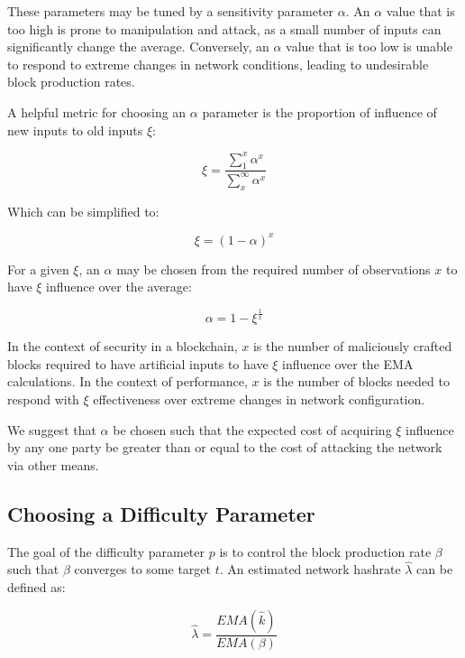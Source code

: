 \documentclass[]{article}
\begin{document}
These parameters may be tuned by a sensitivity parameter $\alpha$.  An $\alpha$ value that is too high is prone to manipulation and attack, as a small number of inputs can significantly change the average.  Conversely, an $\alpha$ value that is too low is unable to respond to extreme changes in network conditions, leading to undesirable block production rates.
\newline 

 A helpful metric for choosing an $\alpha$ parameter is the proportion of influence of new inputs to old inputs $\xi$:

\begin{equation}
\xi = \frac{\sum_{1}^{x} \alpha^x}{\sum_{x}^{\infty} \alpha^x}
\end{equation}

Which can be simplified to: 

\begin{equation}
	\xi = (1 - \alpha)^x
\end{equation}

For a given $\xi$, an $\alpha$ may be chosen from the required number of observations $x$ to have $\xi$ influence over the average: 

\begin{equation}
\alpha = 1 - \xi^\frac{1}{x}
\end{equation}

In the context of security in a blockchain, $x$ is the number of maliciously crafted blocks required to have artificial inputs to have $\xi$ influence over the EMA calculations.  In the context of performance, $x$ is the number of blocks needed to respond with $\xi$ effectiveness over extreme changes in network configuration.  
\newline

We suggest that $\alpha$ be chosen such that the expected cost of acquiring $\xi$ influence by any one party be greater than or equal to the cost of attacking the network via other means.  

\subsection{Choosing a Difficulty Parameter}
The goal of the difficulty parameter $p$ is to control the block production rate $\beta$ such that $\beta$ converges to some target $t$.  An estimated network hashrate $\hat{\lambda}$ can be defined as: 

\begin{equation}
\hat{\lambda} = \frac{EMA(\hat{k})}{EMA(\beta)}
\end{equation}
\end{document}

